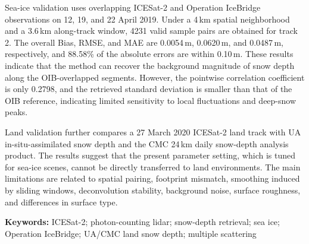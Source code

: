 Sea-ice validation uses overlapping ICESat-2 and Operation IceBridge observations on 12, 19, and 22 April 2019. Under a 4\,km spatial neighborhood and a 3.6\,km along-track window, 4231 valid sample pairs are obtained for track 2. The overall Bias, RMSE, and MAE are 0.0054\,m, 0.0620\,m, and 0.0487\,m, respectively, and 88.58\% of the absolute errors are within 0.10\,m. These results indicate that the method can recover the background magnitude of snow depth along the OIB-overlapped segments. However, the pointwise correlation coefficient is only 0.2798, and the retrieved standard deviation is smaller than that of the OIB reference, indicating limited sensitivity to local fluctuations and deep-snow peaks.

Land validation further compares a 27 March 2020 ICESat-2 land track with UA in-situ-assimilated snow depth and the CMC 24\,km daily snow-depth analysis product. The results suggest that the present parameter setting, which is tuned for sea-ice scenes, cannot be directly transferred to land environments. The main limitations are related to spatial pairing, footprint mismatch, smoothing induced by sliding windows, deconvolution stability, background noise, surface roughness, and differences in surface type.

\textbf{Keywords:} ICESat-2; photon-counting lidar; snow-depth retrieval; sea ice; Operation IceBridge; UA/CMC land snow depth; multiple scattering

